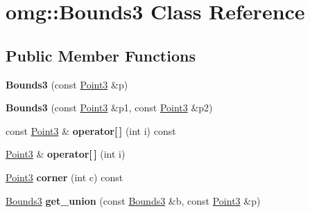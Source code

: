 \hypertarget{classomg_1_1_bounds3}{}\section{omg\+::Bounds3 Class Reference}
\label{classomg_1_1_bounds3}
\subsection*{Public Member Functions}
\begin{DoxyCompactItemize}
\item 
\mbox{\label{classomg_1_1_bounds3_af0a852f0a3c0ef61f8288e64f14bb85d}} 
{\bfseries Bounds3} (const \mbox{\hyperlink{namespaceomg_af85242d35fdacf829d32a6f9b95f3e35}{Point3}} \&p)
\item 
\mbox{\label{classomg_1_1_bounds3_a6b758ce579c215ad17ea8f368b85d999}} 
{\bfseries Bounds3} (const \mbox{\hyperlink{namespaceomg_af85242d35fdacf829d32a6f9b95f3e35}{Point3}} \&p1, const \mbox{\hyperlink{namespaceomg_af85242d35fdacf829d32a6f9b95f3e35}{Point3}} \&p2)
\item 
\mbox{\label{classomg_1_1_bounds3_a083a61dc10d16d2bc60601523fe5089a}} 
const \mbox{\hyperlink{namespaceomg_af85242d35fdacf829d32a6f9b95f3e35}{Point3}} \& {\bfseries operator\mbox{[}$\,$\mbox{]}} (int i) const
\item 
\mbox{\label{classomg_1_1_bounds3_a7f32d6a5e95ad2dc0faa7fec793023ae}} 
\mbox{\hyperlink{namespaceomg_af85242d35fdacf829d32a6f9b95f3e35}{Point3}} \& {\bfseries operator\mbox{[}$\,$\mbox{]}} (int i)
\item 
\mbox{\label{classomg_1_1_bounds3_a217d5fb4a0ecbf40b40861bcd251e6f0}} 
\mbox{\hyperlink{namespaceomg_af85242d35fdacf829d32a6f9b95f3e35}{Point3}} {\bfseries corner} (int c) const
\item 
\mbox{\label{classomg_1_1_bounds3_aa4a10b461acb4bcd7bea1e7be829268c}} 
\mbox{\hyperlink{classomg_1_1_bounds3}{Bounds3}} {\bfseries get\+\_\+union} (const \mbox{\hyperlink{classomg_1_1_bounds3}{Bounds3}} \&b, const \mbox{\hyperlink{namespaceomg_af85242d35fdacf829d32a6f9b95f3e35}{Point3}} \&p)
\item 

\end{DoxyCompactItemize}
